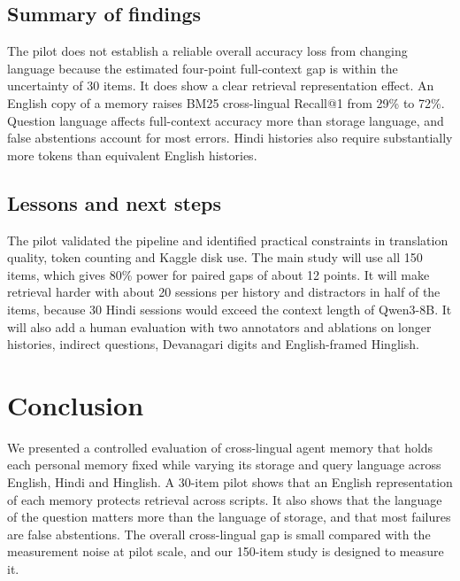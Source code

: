\documentclass[11pt]{article}
\begin{document}
\subsection{Summary of findings}
The pilot does not establish a reliable overall accuracy loss from changing language because the estimated four-point full-context gap is within the uncertainty of 30 items. It does show a clear retrieval representation effect. An English copy of a memory raises BM25 cross-lingual Recall@1 from 29\% to 72\%. Question language affects full-context accuracy more than storage language, and false abstentions account for most errors. Hindi histories also require substantially more tokens than equivalent English histories.

\subsection{Lessons and next steps}
\label{sec:next}
The pilot validated the pipeline and identified practical constraints in translation quality, token counting and Kaggle disk use.
The main study will use all 150 items, which gives 80\% power for paired gaps of about 12 points.
It will make retrieval harder with about 20 sessions per history and distractors in half of the items, because 30 Hindi sessions would exceed the context length of Qwen3-8B.
It will also add a human evaluation with two annotators and ablations on longer histories, indirect questions, Devanagari digits and English-framed Hinglish.

\section{Conclusion}
We presented a controlled evaluation of cross-lingual agent memory that holds each personal memory fixed while varying its storage and query language across English, Hindi and Hinglish.
A 30-item pilot shows that an English representation of each memory protects retrieval across scripts.
It also shows that the language of the question matters more than the language of storage, and that most failures are false abstentions.
The overall cross-lingual gap is small compared with the measurement noise at pilot scale, and our 150-item study is designed to measure it.

\end{document}
